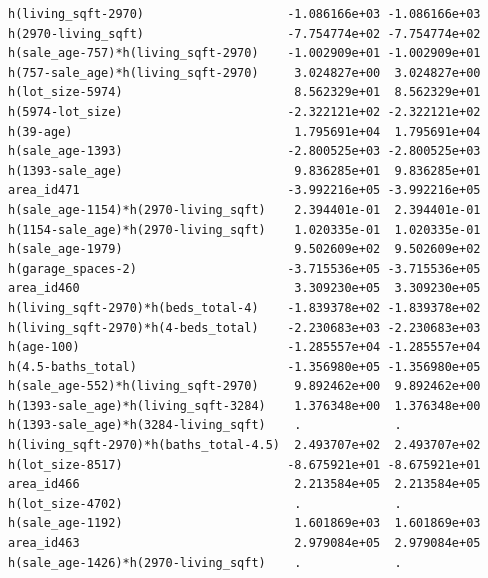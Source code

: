 \documentclass[
]{article}
\begin{document}
\begin{verbatim}
h(living_sqft-2970)                    -1.086166e+03 -1.086166e+03
h(2970-living_sqft)                    -7.754774e+02 -7.754774e+02
h(sale_age-757)*h(living_sqft-2970)    -1.002909e+01 -1.002909e+01
h(757-sale_age)*h(living_sqft-2970)     3.024827e+00  3.024827e+00
h(lot_size-5974)                        8.562329e+01  8.562329e+01
h(5974-lot_size)                       -2.322121e+02 -2.322121e+02
h(39-age)                               1.795691e+04  1.795691e+04
h(sale_age-1393)                       -2.800525e+03 -2.800525e+03
h(1393-sale_age)                        9.836285e+01  9.836285e+01
area_id471                             -3.992216e+05 -3.992216e+05
h(sale_age-1154)*h(2970-living_sqft)    2.394401e-01  2.394401e-01
h(1154-sale_age)*h(2970-living_sqft)    1.020335e-01  1.020335e-01
h(sale_age-1979)                        9.502609e+02  9.502609e+02
h(garage_spaces-2)                     -3.715536e+05 -3.715536e+05
area_id460                              3.309230e+05  3.309230e+05
h(living_sqft-2970)*h(beds_total-4)    -1.839378e+02 -1.839378e+02
h(living_sqft-2970)*h(4-beds_total)    -2.230683e+03 -2.230683e+03
h(age-100)                             -1.285557e+04 -1.285557e+04
h(4.5-baths_total)                     -1.356980e+05 -1.356980e+05
h(sale_age-552)*h(living_sqft-2970)     9.892462e+00  9.892462e+00
h(1393-sale_age)*h(living_sqft-3284)    1.376348e+00  1.376348e+00
h(1393-sale_age)*h(3284-living_sqft)    .             .           
h(living_sqft-2970)*h(baths_total-4.5)  2.493707e+02  2.493707e+02
h(lot_size-8517)                       -8.675921e+01 -8.675921e+01
area_id466                              2.213584e+05  2.213584e+05
h(lot_size-4702)                        .             .           
h(sale_age-1192)                        1.601869e+03  1.601869e+03
area_id463                              2.979084e+05  2.979084e+05
h(sale_age-1426)*h(2970-living_sqft)    .             .           
                                                                  

\end{verbatim}
\end{document}
